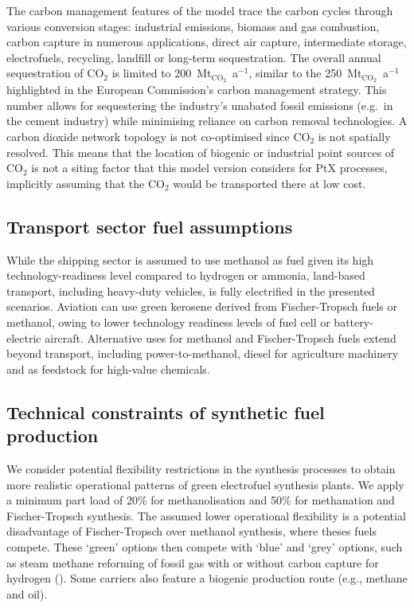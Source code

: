 The carbon management features of the model trace the carbon cycles through
various conversion stages: industrial emissions, biomass and gas combustion,
carbon capture in numerous applications, direct air capture, intermediate
storage, electrofuels, recycling, landfill or long-term sequestration. The
overall annual sequestration of CO$_2$ is limited to
200~Mt$_{\text{CO}_2}$~a$^{-1}$, similar to the 250~Mt$_{\text{CO}_2}$~a$^{-1}$
highlighted in the European Commission's carbon management
strategy.\cite{europeancommissionAmbitiousIndustrialCarbon2024} This number
allows for sequestering the industry's unabated fossil emissions (e.g.~in the
cement industry) while minimising reliance on carbon removal technologies. A
carbon dioxide network topology is not co-optimised since CO$_2$ is not
spatially resolved. This means that the location of biogenic or industrial point
sources of CO$_2$ is not a siting factor that this model version considers for
PtX processes, implicitly assuming that the CO$_2$ would be transported there at
low cost. \cite{hofmannDesigningCO22023,hofmannH2CO2Network2024}

\subsection*{Transport sector fuel assumptions}
\label{sec:methods-transport}

While the shipping sector is assumed to use methanol as fuel given its high
technology-readiness level compared to hydrogen or
ammonia,\cite{ieaETPCleanEnergy2024} land-based transport, including heavy-duty
vehicles, is fully electrified in the presented
scenarios.\cite{linkRapidlyDecliningCosts2024} Aviation can use green kerosene
derived from Fischer-Tropsch fuels or methanol, owing to lower technology
readiness levels of fuel cell or battery-electric
aircraft.\cite{ieaETPCleanEnergy2024} Alternative uses for methanol and
Fischer-Tropsch fuels extend beyond transport, including
power-to-methanol,\cite{brownUltralongdurationEnergyStorage2023} diesel for
agriculture machinery and as feedstock for high-value chemicals.

\subsection*{Technical constraints of synthetic fuel production}
\label{sec:methods-efuels}

We consider potential flexibility restrictions in the synthesis processes to
obtain more realistic operational patterns of green electrofuel synthesis
plants. We apply a minimum part load of 20\% for methanolisation and 50\% for
methanation and Fischer-Tropsch
synthesis.\cite{mucciPowerXProcessesBased2023,wentrupDynamicOperationFischerTropsch2022,dieterichPowerliquidSynthesisMethanol2020,mbathaPowermethanolProcessReview2021}
The assumed lower operational flexibility is a potential disadvantage of
Fischer-Tropsch over methanol synthesis, where theses fuels compete. These
`green' options then compete with `blue' and `grey' options, such as steam
methane reforming of fossil gas with or without carbon capture for hydrogen
(). Some carriers also feature a
biogenic production route (e.g., methane and oil).

